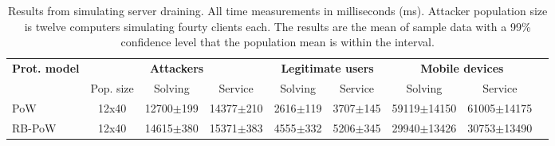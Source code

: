   \begin{table}[H]
    \centering
    \tiny
    \caption{Results from simulating server draining. All time measurements in milliseconds (ms). Attacker population size is twelve computers simulating fourty clients each.  The results are the mean of sample data with a 99\% confidence level that the population mean is within the interval.}\label{tab:draining}

    \begin{tabularx}{1.05\textwidth}{lcccccccr} \toprule
      \multicolumn{1}{c}{\textbf{Prot. model}} & \multicolumn{3}{c}{\textbf{Attackers}} & \multicolumn{2}{c}{\textbf{Legitimate users}} & \multicolumn{2}{c}{\textbf{Mobile devices}} \\
      \multicolumn{1}{c}{} & \multicolumn{1}{c}{Pop. size} & \multicolumn{1}{c}{Solving} & \multicolumn{1}{c}{Service} & \multicolumn{1}{c}{Solving} & \multicolumn{1}{c}{Service} & \multicolumn{1}{c}{Solving} & \multicolumn{1}{c}{Service}  \\ \toprule
      PoW &  12x40  & 12700$\pm$199 & 14377$\pm$210 & 2616$\pm$119 & 3707$\pm$145 & 59119$\pm$14150 & 61005$\pm$14175    \\
      RB-PoW & 12x40 & 14615$\pm$380 & 15371$\pm$383 & 4555$\pm$332 & 5206$\pm$345 & 29940$\pm$13426 & 30753$\pm$13490   \\ \bottomrule
    \end{tabularx}
  \end{table}
